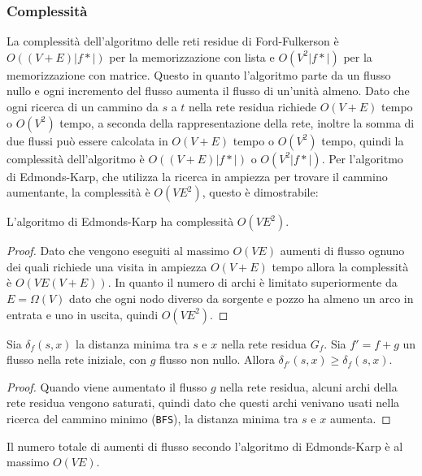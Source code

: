     \subsubsection{Complessità}
        La complessità dell'algoritmo delle reti residue di Ford-Fulkerson è $O((V+E)|f*|)$ per la memorizzazione con lista e $O(V^2|f*|)$ per la memorizzazione con matrice. Questo in quanto l'algoritmo parte da un flusso nullo e ogni incremento del flusso aumenta il flusso di un'unità almeno. Dato che ogni ricerca di un cammino da $s$ a $t$ nella rete residua richiede $O(V+E)$ tempo o $O(V^2)$ tempo, a seconda della rappresentazione della rete, inoltre la somma di due flussi può essere calcolata in $O(V+E)$ tempo o $O(V^2)$ tempo, quindi la complessità dell'algoritmo è $O((V+E)|f*|)$ o $O(V^2|f*|)$.\newline
        Per l'algoritmo di Edmonds-Karp, che utilizza la ricerca in ampiezza per trovare il cammino aumentante, la complessità è $O(VE^2)$, questo è dimostrabile:
        \begin{theorem}
            L'algoritmo di Edmonds-Karp ha complessità $O(VE^2)$.
        \end{theorem}
        \begin{proof}
            Dato che vengono eseguiti al massimo $O(VE)$ aumenti di flusso ognuno dei quali richiede una visita in ampiezza $O(V+E)$ tempo allora la complessità è $O(VE(V+E))$. In quanto il numero di archi è limitato superiormente da $E=\Omega(V)$ dato che ogni nodo diverso da sorgente e pozzo ha almeno un arco in entrata e uno in uscita, quindi $O(VE^2)$.
        \end{proof}
        \begin{theorem}
            Sia $\delta_f(s,x)$ la distanza minima tra $s$ e $x$ nella rete residua $G_f$. Sia $f'=f+g$ un flusso nella rete iniziale, con $g$ flusso non nullo. Allora $\delta_{f'}(s,x) \geq \delta_f(s,x)$.
        \end{theorem}
        \begin{proof}
            Quando viene aumentato il flusso $g$ nella rete residua, alcuni archi della rete residua vengono saturati, quindi dato che questi archi venivano usati nella ricerca del cammino minimo (\texttt{BFS}), la distanza minima tra $s$ e $x$ aumenta.
        \end{proof}
        \begin{theorem}
            Il numero totale di aumenti di flusso secondo l'algoritmo di Edmonds-Karp è al massimo $O(VE)$.
        \end{theorem}
